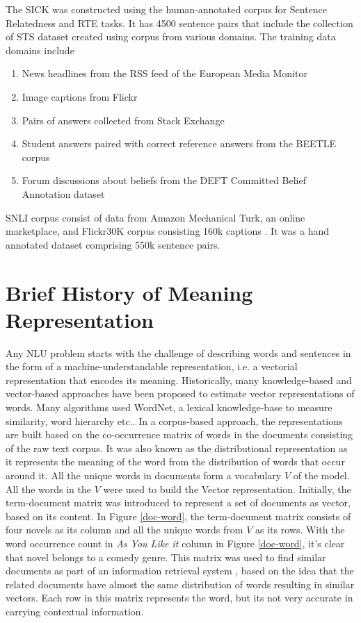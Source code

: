 \documentclass[12pt]{report} %
\begin{document}
The SICK \cite{marelli2014semeval}  was constructed using the human-annotated corpus for Sentence Relatedness and RTE tasks. It has 4500 sentence pairs that include the collection of STS dataset created using corpus from various domains. The training data domains include 
\begin{enumerate}
	\item News headlines from the RSS feed of the European Media Monitor
	\item Image captions from Flickr
	\item Pairs of answers collected from Stack Exchange
	\item Student answers paired with correct reference answers from the BEETLE corpus
	\item Forum discussions about beliefs from the DEFT Committed Belief Annotation dataset
\end{enumerate}

  SNLI corpus consist of data from Amazon Mechanical Turk, an online marketplace, and Flickr30K corpus consisting 160k captions \citep{bowman2015large}. It was a hand annotated dataset comprising 550k sentence pairs.

\section{Brief History of Meaning Representation}
\label{history}

Any NLU problem starts with the challenge of describing words and sentences in the form of a machine-understandable representation, i.e. a vectorial representation that encodes its meaning. Historically, many knowledge-based and vector-based approaches have been proposed to estimate vector representations of words. Many algorithms used WordNet, a lexical knowledge-base to measure similarity, word hierarchy etc.. In a corpus-based approach, the representations are built based on the co-occurrence matrix of words in the documents consisting of the raw text corpus. It was also known as the distributional representation as it represents the meaning of the word from the distribution of words that occur around it. All the unique words in documents form a vocabulary $V$ of the model. All the words in the $V$ were used to build the Vector representation. Initially, the term-document matrix was introduced to represent a set of documents as vector, based on its content. In Figure \ref{doc-word}, the term-document matrix consists of four novels as its column and all the unique words from $V$ as its rows. With the word occurrence count in \textit{As You Like it} column in Figure \ref{doc-word}, it's clear that novel belongs to a comedy genre.  This matrix was used to find similar documents as part of an information retrieval system \citep{salton1971smart}, based on the idea that the related documents have almost the same distribution of words resulting in similar vectors.  Each row in this matrix represents the word, but its not very accurate in carrying contextual information. 
\end{document}
